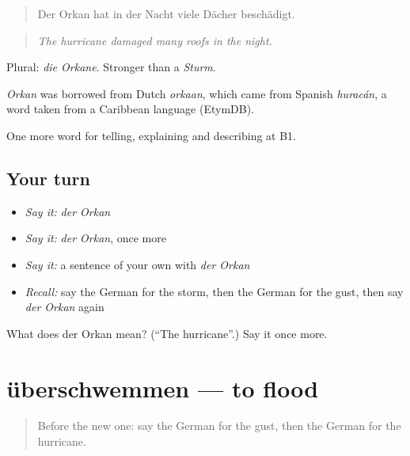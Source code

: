 \begin{quote}
Der Orkan hat in der Nacht viele Dächer beschädigt.
\end{quote}

\begin{quote}
\emph{The hurricane damaged many roofs in the night.}
\end{quote}

Plural: \emph{die Orkane}. Stronger than a \emph{Sturm}.

\begin{cousinweb}
\emph{Orkan} was borrowed from Dutch \emph{orkaan}, which came from Spanish \emph{huracán}, a word taken from a Caribbean language (EtymDB).
\end{cousinweb}

\begin{grammarlens}[title={What you've built}]
One more word for telling, explaining and describing at B1.
\end{grammarlens}

\subsection*{Your turn}
\begin{itemize}
\raggedright
  \item \emph{Say it:} \emph{der Orkan}
  \item \emph{Say it:} \emph{der Orkan}, once more
  \item \emph{Say it:} a sentence of your own with \emph{der Orkan}
  \item \emph{Recall:} say the German for the storm, then the German for the gust, then say \emph{der Orkan} again
\end{itemize}

\begin{tcolorbox}[breakable,colback=teal!4,colframe=teal!35!black,title={Before you move on}]
What does der Orkan mean? (\textquotedblleft{}The hurricane\textquotedblright{}.) Say it once more.
\end{tcolorbox}
\section[überschwemmen]{überschwemmen — to flood}

\label{lesson:GE-C465-ueberschwemmen}



\begin{quote}
Before the new one: say the German for the gust, then the German for the hurricane.
\end{quote}

